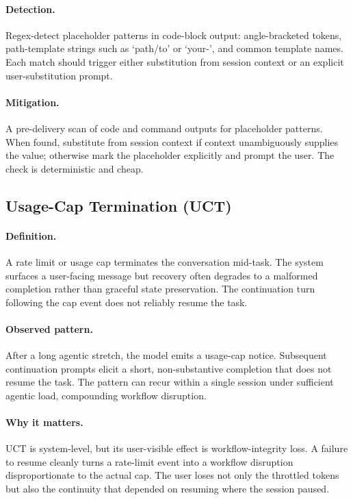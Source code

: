 \documentclass[11pt]{article}
\begin{document}
\paragraph{Detection.} Regex-detect placeholder patterns in code-block output: angle-bracketed tokens, path-template strings such as `path/to' or `your-', and common template names. Each match should trigger either substitution from session context or an explicit user-substitution prompt.

\paragraph{Mitigation.} A pre-delivery scan of code and command outputs for placeholder patterns. When found, substitute from session context if context unambiguously supplies the value; otherwise mark the placeholder explicitly and prompt the user. The check is deterministic and cheap.

\subsection{Usage-Cap Termination (UCT)}
\paragraph{Definition.} A rate limit or usage cap terminates the conversation mid-task. The system surfaces a user-facing message but recovery often degrades to a malformed completion rather than graceful state preservation. The continuation turn following the cap event does not reliably resume the task.

\paragraph{Observed pattern.} After a long agentic stretch, the model emits a usage-cap notice. Subsequent continuation prompts elicit a short, non-substantive completion that does not resume the task. The pattern can recur within a single session under sufficient agentic load, compounding workflow disruption.

\paragraph{Why it matters.} UCT is system-level, but its user-visible effect is workflow-integrity loss. A failure to resume cleanly turns a rate-limit event into a workflow disruption disproportionate to the actual cap. The user loses not only the throttled tokens but also the continuity that depended on resuming where the session paused.
\end{document}
